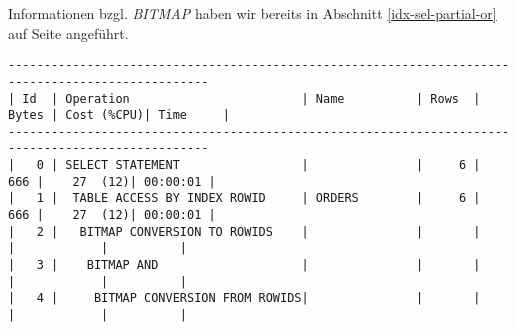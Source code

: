 \documentclass[11pt,a4paper,parskip=half]{scrartcl}
\begin{document}
Informationen bzgl. \emph{BITMAP} haben wir bereits in Abschnitt \ref{idx-sel-partial-or} auf Seite \pageref{idx-sel-partial-or} angeführt.
\begin{lstlisting}
--------------------------------------------------------------------------------------------------                                                                                                                                                                                                           
| Id  | Operation                        | Name          | Rows  | Bytes | Cost (%CPU)| Time     |                                                                                                                                                                                                           
--------------------------------------------------------------------------------------------------                                                                                                                                                                                                           
|   0 | SELECT STATEMENT                 |               |     6 |   666 |    27  (12)| 00:00:01 |                                                                                                                                                                                                           
|   1 |  TABLE ACCESS BY INDEX ROWID     | ORDERS        |     6 |   666 |    27  (12)| 00:00:01 |                                                                                                                                                                                                           
|   2 |   BITMAP CONVERSION TO ROWIDS    |               |       |       |            |          |                                                                                                                                                                                                           
|   3 |    BITMAP AND                    |               |       |       |            |          |                                                                                                                                                                                                           
|   4 |     BITMAP CONVERSION FROM ROWIDS|               |       |       |            |          |                                                                                                                                                                                                           

\end{lstlisting}
\end{document}
